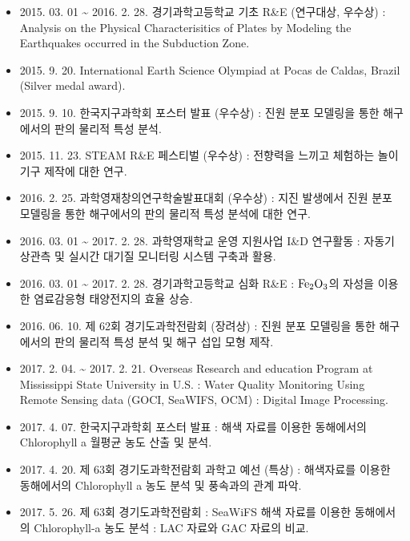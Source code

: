 \begin{researches}
\begin{itemize}
\item{2015. 03. 01 \~{} 2016. 2. 28. 경기과학고등학교 기초 R\&E (연구대상, 우수상) : Analysis on the Physical Characterisitics of Plates by Modeling the Earthquakes occurred in the Subduction Zone.}
\item{2015. 9. 20. International Earth Science Olympiad at Pocas de Caldas, Brazil (Silver medal award).}
\item{2015. 9. 10. 한국지구과학회 포스터 발표 (우수상) : 진원 분포 모델링을 통한 해구에서의 판의 물리적 특성 분석.}
\item{2015. 11. 23. STEAM R\&E 페스티벌 (우수상) : 전향력을 느끼고 체험하는 놀이기구 제작에 대한 연구.}
\item{2016. 2. 25. 과학영재창의연구학술발표대회 (우수상) : 지진 발생에서 진원 분포 모델링을 통한 해구에서의 판의 물리적 특성 분석에 대한 연구.}
\item{2016. 03. 01 \~{} 2017. 2. 28. 과학영재학교 운영 지원사업 I\&D 연구활동 : 자동기상관측 및 실시간 대기질 모니터링 시스템 구축과 활용.}
\item{2016. 03. 01 \~{} 2017. 2. 28. 경기과학고등학교 심화 R\&E : $  \rm Fe_{2}O_{3}$의 자성을 이용한 염료감응형 태양전지의 효율 상승.}
\item{2016. 06. 10. 제 62회 경기도과학전람회 (장려상) : 진원 분포 모델링을 통한 해구에서의 판의 물리적 특성 분석 및 해구 섭입 모형 제작.}
\item{2017. 2. 04. \~{} 2017. 2. 21. Overseas Research and education Program at Mississippi State University in U.S. : Water Quality Monitoring Using Remote Sensing data (GOCI, SeaWIFS, OCM) : Digital Image Processing.}
\item{2017. 4. 07. 한국지구과학회 포스터 발표 : 해색 자료를 이용한 동해에서의 Chlorophyll a 월평균 농도 산출 및 분석.}
\item{2017. 4. 20. 제 63회 경기도과학전람회 과학고 예선 (특상) : 해색자료를 이용한 동해에서의 Chlorophyll a 농도 분석 및 풍속과의 관계 파악.}
\item{2017. 5. 26. 제 63회 경기도과학전람회 : SeaWiFS 해색 자료를 이용한 동해에서의 Chlorophyll-a 농도 분석 : LAC 자료와 GAC 자료의 비교.}
\end{itemize}
\end{researches}